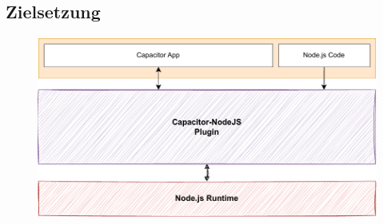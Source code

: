\subsection{Zielsetzung}

\begin{figure}[H]
    \centering
    \includegraphics[width=\textwidth]{assets/02_Capacitor-NodeJS/01_Zielsetzung.drawio.pdf}
\end{figure}


\clearpage

